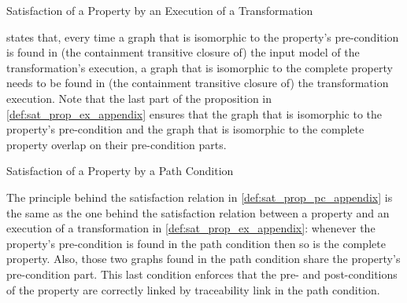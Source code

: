 \begin{definition}{Satisfaction of a Property by an Execution of a Transformation\\}
\label{def:sat_prop_ex_appendix}
\end{definition}

 states that, every time a graph that is isomorphic to the property's pre-condition is found in (the containment transitive closure of) the input model of the transformation's execution, a graph that is isomorphic to the complete property needs to be found in (the containment transitive closure of) the transformation execution. Note that the last part of the proposition in \cref{def:sat_prop_ex_appendix} ensures that the graph that is isomorphic to the property's pre-condition and the graph that is isomorphic to the complete property overlap on their pre-condition parts.


\begin{definition}{Satisfaction of a Property by a Path Condition\\}
\label{def:sat_prop_pc_appendix}
\end{definition}

The principle behind the satisfaction relation in \cref{def:sat_prop_pc_appendix} is the same as the one behind the satisfaction relation between a property and an execution of a transformation in \cref{def:sat_prop_ex_appendix}: whenever the property's pre-condition is found in the path condition then so is the complete property. Also, those two graphs found in the path condition share the property's pre-condition part. This last condition enforces that the pre- and post-conditions of the property are correctly linked by traceability link in the path condition.

